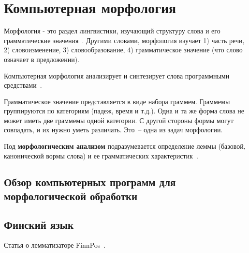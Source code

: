 \section{Компьютерная морфология} \label{sect_review_comp_morphology}

Морфология - это раздел лингвистики, изучающий структуру слова и его грамматические значения~\cite{MitreninaNikolaevLando2016}. Другими словами, морфология изучает
1) часть речи,
2) словоизменение,
3) словообразование,
4) грамматическое значение (что слово означает в предложении). 

Компьютерная морфология анализирует и синтезирует слова программными средствами~\cite{MitreninaNikolaevLando2016}. 

Грамматическое значение представляется в виде набора граммем. Граммемы группируются по категориям (падеж, время и т.д.). Одна и та же форма слова не может иметь две граммемы одной категории. С другой стороны формы могут совпадать, и их нужно уметь различать. Это~-- одна из задач морфологии.


Под \textbf{морфологическим анализом} подразумевается определение леммы (базовой, канонической вормы слова) и ее грамматических характеристик~\cite{MitreninaNikolaevLando2016}.




\subsection{Обзор компьютерных программ для морфологической обработки}

\subsection{Финский язык} \label{sect_review_fin}

Статья о лемматизаторе FinnPos~\cite{silfverberg2016finnpos}.

